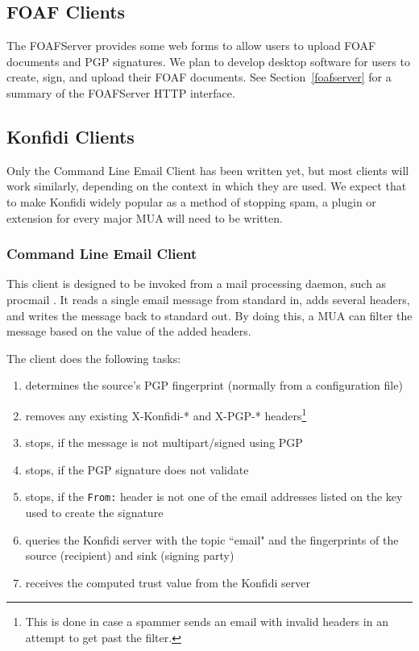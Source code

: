\documentclass[letterpaper]{www2006-submission}
\begin{document}
\subsection{FOAF Clients}
The FOAFServer provides some web forms to allow users to upload FOAF documents and PGP signatures.  We plan to develop desktop software for users to create, sign, and upload their FOAF documents.  See Section~\ref{foafserver} for a summary of the FOAFServer HTTP interface.

\subsection{Konfidi Clients}
Only the Command Line Email Client has been written yet, but most clients will work similarly, depending on the context in which they are used.  We expect that to make Konfidi widely popular as a method of stopping spam, a plugin or extension for every major MUA will need to be written.

\subsubsection{Command Line Email Client}
This client is designed to be invoked from a mail processing daemon, such as procmail \citep{procmail}.  It reads a single email message from standard in, adds several headers, and writes the message back to standard out.  By doing this, a MUA can filter the message based on the value of the added headers.

The client does the following tasks:
\begin{enumerate}
\item determines the source's PGP fingerprint (normally from a configuration file)
\item  removes any existing X-Konfidi-* and X-PGP-* headers\footnote{This is done in case a spammer sends an email with invalid headers in an attempt to get past the filter.}
\item  stops, if the message is not multipart/signed using PGP
\item  stops, if the PGP signature does not validate
\item  stops, if the \texttt{From:} header is not one of the email addresses listed on the key used to create the signature
\item  queries the Konfidi server with the topic ``email" and the fingerprints of the source (recipient) and sink (signing party)
\item  receives the computed trust value from the Konfidi server
\end{enumerate}
\end{document}

